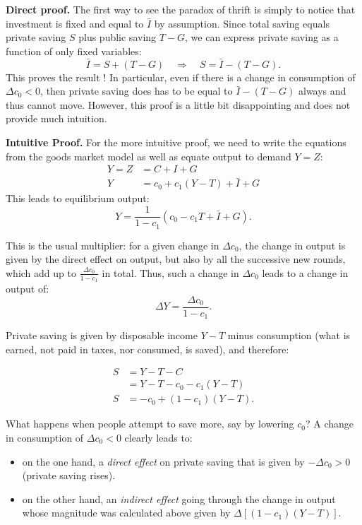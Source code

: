 \documentclass[]{book}
\theoremstyle{definition}
\theoremstyle{definition}
\theoremstyle{definition}
\theoremstyle{remark}
\begin{document}
\textbf{Direct proof.} The first way to see the paradox of thrift is
simply to notice that investment is fixed and equal to \(\bar{I}\) by
assumption. Since total saving equals private saving \(S\) plus public
saving \(T-G\), we can express private saving as a function of only
fixed variables:
\[\bar{I}=S+\left(T-G\right)\quad\Rightarrow\quad S=\bar{I}-\left(T-G\right).\]
This proves the result ! In particular, even if there is a change in
consumption of \(\Delta c_{0}<0\), then private saving does has to be
equal to \(\bar{I}-\left(T-G\right)\) always and thus cannot move.
However, this proof is a little bit disappointing and does not provide
much intuition.

\textbf{Intuitive Proof.} For the more intuitive proof, we need to write
the equations from the goods market model as well as equate output to
demand \(Y=Z\): \[\begin{aligned}
Y   =Z&=C+I+G\\
Y   &=c_{0}+c_{1}(Y-T)+\bar{I}+G
\end{aligned}\] This leads to equilibrium output:
\[Y=\frac{1}{1-c_{1}}\left(c_{0}-c_{1}T+\bar{I}+G\right).\]

This is the usual multiplier: for a given change in \(\Delta c_{0}\),
the change in output is given by the direct effect on output, but also
by all the successive new rounds, which add up to
\(\frac{\Delta c_{0}}{1-c_{1}}\) in total. Thus, such a change in
\(\Delta c_{0}\) leads to a change in output of:
\[\Delta Y=\frac{\Delta c_{0}}{1-c_{1}}.\]

Private saving is given by disposable income \(Y-T\) minus consumption
(what is earned, not paid in taxes, nor consumed, is saved), and
therefore:

\[
\begin{aligned}
S &= Y-T-C\\
&= Y-T-c_{0}-c_{1}\left(Y-T\right)\\
S   &= -c_{0}+\left(1-c_{1}\right)\left(Y-T\right).
\end{aligned}
\]

What happens when people attempt to save more, say by lowering
\(c_{0}\)? A change in consumption of \(\Delta c_{0}<0\) clearly leads
to:

\begin{itemize}
\item
  on the one hand, a \emph{direct effect} on private saving that is
  given by \(-\Delta c_{0}>0\) (private saving rises).
\item
  on the other hand, an \emph{indirect effect} going through the change
  in output whose magnitude was calculated above given by
  \(\Delta\left[\left(1-c_{1}\right)\left(Y-T\right)\right]\).
\end{itemize}
\end{document}
